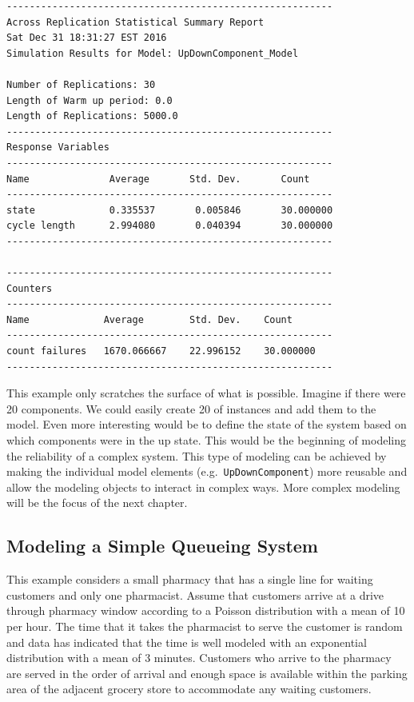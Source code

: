 \documentclass[
]{book}
\theoremstyle{definition}
\theoremstyle{definition}
\theoremstyle{definition}
\theoremstyle{definition}
\theoremstyle{remark}
\begin{document}
\begin{verbatim}
---------------------------------------------------------
Across Replication Statistical Summary Report
Sat Dec 31 18:31:27 EST 2016
Simulation Results for Model: UpDownComponent_Model

Number of Replications: 30
Length of Warm up period: 0.0
Length of Replications: 5000.0
---------------------------------------------------------
Response Variables
---------------------------------------------------------
Name              Average       Std. Dev.       Count 
---------------------------------------------------------
state             0.335537       0.005846       30.000000 
cycle length      2.994080       0.040394       30.000000 
---------------------------------------------------------

---------------------------------------------------------
Counters
---------------------------------------------------------
Name             Average        Std. Dev.    Count 
---------------------------------------------------------
count failures   1670.066667    22.996152    30.000000 
---------------------------------------------------------
\end{verbatim}

This example only scratches the surface of what is possible. Imagine if
there were 20 components. We could easily create 20 of instances and add
them to the model. Even more interesting would be to define the state of
the system based on which components were in the up state. This would be
the beginning of modeling the reliability of a complex system. This type
of modeling can be achieved by making the individual model elements
(e.g.~\texttt{UpDownComponent}) more reusable and allow the modeling objects to
interact in complex ways. More complex modeling will be the focus of the
next chapter.

\hypertarget{introDEDS:pharmacy}{%
\subsection{Modeling a Simple Queueing System}\label{introDEDS:pharmacy}}

This example considers a small pharmacy that has a single line for
waiting customers and only one pharmacist. Assume that customers arrive
at a drive through pharmacy window according to a Poisson distribution
with a mean of 10 per hour. The time that it takes the pharmacist to
serve the customer is random and data has indicated that the time is
well modeled with an exponential distribution with a mean of 3 minutes.
Customers who arrive to the pharmacy are served in the order of arrival
and enough space is available within the parking area of the adjacent
grocery store to accommodate any waiting customers.
\end{document}
